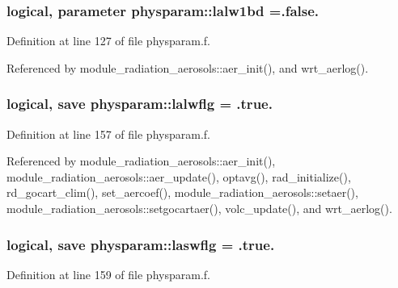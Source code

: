 \subsubsection[{\texorpdfstring{lalw1bd}{lalw1bd}}]{\setlength{\rightskip}{0pt plus 5cm}logical, parameter physparam\+::lalw1bd =.false.}\hypertarget{namespacephysparam_a7ca56a779d7583fcd17b538bf6eb8a84}{}\label{namespacephysparam_a7ca56a779d7583fcd17b538bf6eb8a84}


Definition at line 127 of file physparam.\+f.



Referenced by module\+\_\+radiation\+\_\+aerosols\+::aer\+\_\+init(), and wrt\+\_\+aerlog().

\subsubsection[{\texorpdfstring{lalwflg}{lalwflg}}]{\setlength{\rightskip}{0pt plus 5cm}logical, save physparam\+::lalwflg = .true.}\hypertarget{namespacephysparam_aeec2f09912564e297253bf32bf362928}{}\label{namespacephysparam_aeec2f09912564e297253bf32bf362928}


Definition at line 157 of file physparam.\+f.



Referenced by module\+\_\+radiation\+\_\+aerosols\+::aer\+\_\+init(), module\+\_\+radiation\+\_\+aerosols\+::aer\+\_\+update(), optavg(), rad\+\_\+initialize(), rd\+\_\+gocart\+\_\+clim(), set\+\_\+aercoef(), module\+\_\+radiation\+\_\+aerosols\+::setaer(), module\+\_\+radiation\+\_\+aerosols\+::setgocartaer(), volc\+\_\+update(), and wrt\+\_\+aerlog().

\subsubsection[{\texorpdfstring{laswflg}{laswflg}}]{\setlength{\rightskip}{0pt plus 5cm}logical, save physparam\+::laswflg = .true.}\hypertarget{namespacephysparam_aed1b9ce25d416e9149353f2075030bfa}{}\label{namespacephysparam_aed1b9ce25d416e9149353f2075030bfa}


Definition at line 159 of file physparam.\+f.



